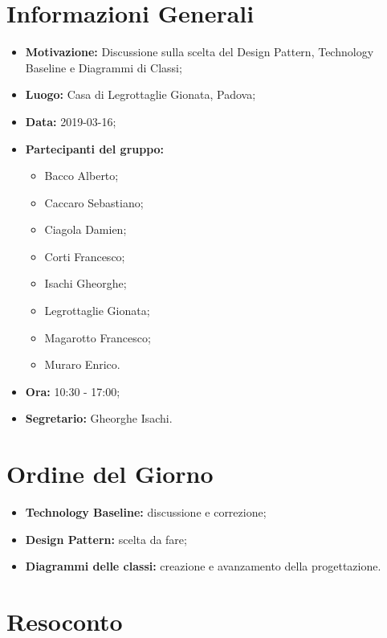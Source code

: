 \documentclass[a4paper, oneside, openany, dvipsnames, table]{article}
\begin{document}
\copertina{}


\newpage
\tableofcontents
\newpage
\section{Informazioni Generali}
\begin{itemize}
\item \textbf{Motivazione:} Discussione sulla scelta del Design Pattern, Technology Baseline e Diagrammi di Classi;
\item \textbf{Luogo:} Casa di Legrottaglie Gionata, Padova;
\item \textbf{Data:} 2019-03-16;
\item \textbf{Partecipanti del gruppo:} \hfill
	\begin{itemize}
	\item Bacco Alberto;
	\item Caccaro Sebastiano;
	\item Ciagola Damien;
	\item Corti Francesco;
	\item Isachi Gheorghe;
	\item Legrottaglie Gionata;
	\item Magarotto Francesco;
	\item Muraro Enrico.
	\end{itemize} 
\item \textbf{Ora:} 10:30 - 17:00;
\item \textbf{Segretario:} Gheorghe Isachi.
\end{itemize}

\section{Ordine del Giorno}
\begin{itemize}
\item \textbf{Technology Baseline:} discussione e correzione;
\item \textbf{Design Pattern:} scelta da fare; 
\item \textbf{Diagrammi delle classi:} creazione e avanzamento della progettazione.
\end{itemize}

\section{Resoconto}
\end{document}
